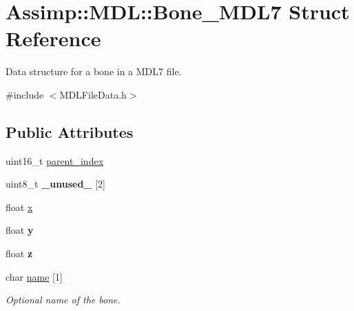 \hypertarget{struct_assimp_1_1_m_d_l_1_1_bone___m_d_l7}{\section{Assimp\+:\+:M\+D\+L\+:\+:Bone\+\_\+\+M\+D\+L7 Struct Reference}
\label{struct_assimp_1_1_m_d_l_1_1_bone___m_d_l7}
}


Data structure for a bone in a M\+D\+L7 file.  




{\ttfamily \#include $<$M\+D\+L\+File\+Data.\+h$>$}

\subsection*{Public Attributes}
\begin{DoxyCompactItemize}
\item 
uint16\+\_\+t \hyperlink{struct_assimp_1_1_m_d_l_1_1_bone___m_d_l7_a60d6ad925de5dbf371061fdd3576c776}{parent\+\_\+index}
\item 
\hypertarget{struct_assimp_1_1_m_d_l_1_1_bone___m_d_l7_ac476b49dafd06c31fa6c75880edf66e5}{uint8\+\_\+t {\bfseries \+\_\+unused\+\_\+} \mbox{[}2\mbox{]}}\label{struct_assimp_1_1_m_d_l_1_1_bone___m_d_l7_ac476b49dafd06c31fa6c75880edf66e5}

\item 
float \hyperlink{struct_assimp_1_1_m_d_l_1_1_bone___m_d_l7_a06338a1d122c6c1f5f2e256d127e3124}{x}
\item 
\hypertarget{struct_assimp_1_1_m_d_l_1_1_bone___m_d_l7_a8273ee0db740fb8d78c1fab885d35dd8}{float {\bfseries y}}\label{struct_assimp_1_1_m_d_l_1_1_bone___m_d_l7_a8273ee0db740fb8d78c1fab885d35dd8}

\item 
\hypertarget{struct_assimp_1_1_m_d_l_1_1_bone___m_d_l7_ae2b980fd8761153725bbd7b52fc48ea0}{float {\bfseries z}}\label{struct_assimp_1_1_m_d_l_1_1_bone___m_d_l7_ae2b980fd8761153725bbd7b52fc48ea0}

\item 
\hypertarget{struct_assimp_1_1_m_d_l_1_1_bone___m_d_l7_a937122f3ac09de875da46c96df767d3e}{char \hyperlink{struct_assimp_1_1_m_d_l_1_1_bone___m_d_l7_a937122f3ac09de875da46c96df767d3e}{name} \mbox{[}1\mbox{]}}\label{struct_assimp_1_1_m_d_l_1_1_bone___m_d_l7_a937122f3ac09de875da46c96df767d3e}

\begin{DoxyCompactList}\small\item\em Optional name of the bone. \end{DoxyCompactList}\end{DoxyCompactItemize}



